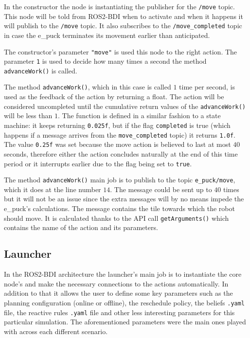 In the constructor the node is instantiating the publisher for the \texttt{/move} topic. This node will be told from ROS2-BDI when to activate and when it happens it will publish to the \texttt{/move} topic. It also subscribes to the \texttt{/move\_completed} topic in case the e\_puck terminates its movement earlier than anticipated. 
\par
The constructor's parameter \texttt{"move"} is used this node to the right action. The parameter \texttt{1} is used to decide how many times a second the method \texttt{advanceWork()} is called.
\par
The method \texttt{advanceWork()}, which in this case is called $1$ time per second, is used as the feedback of the action by returning a float. The action will be considered uncompleted until the cumulative return values of the \texttt{advanceWork()} will be less than $1$. The function is defined in a similar fashion to a state machine: it keeps returning \texttt{0.025f}, but if the flag \texttt{completed} is true (which happens if a message arrives from the \texttt{move\_completed} topic) it returns \texttt{1.0f}. The value \texttt{0.25f} was set because the move action is believed to last at most $40$ seconds, therefore either the action concludes naturally at the end of this time period or it interrupts earlier due to the flag being set to \texttt{true}.
\par
The method \texttt{advanceWork()} main job is to publish to the topic \texttt{e\_puck/move}, which it does at the line number $14$. The message could be sent up to $40$ times but it will not be an issue since the extra messages will by no means impede the e\_puck's calculations. The message contains the tile towards which the robot should move. It is calculated thanks to the API call \texttt{getArguments()} which contains the name of the action and its parameters.
\subsection{Launcher} In the ROS2-BDI architecture the launcher's main job is to instantiate the core node's and make the necessary connections to the actions automatically. In addition to that it allows the user to define some key parameters such as the planning configuration (online or offline), the reschedule policy, the beliefs \texttt{.yaml} file, the reactive rules \texttt{.yaml} file and other less interesting parameters for this particular simulation. The aforementioned parameters were the main ones played with across each different scenario. 
